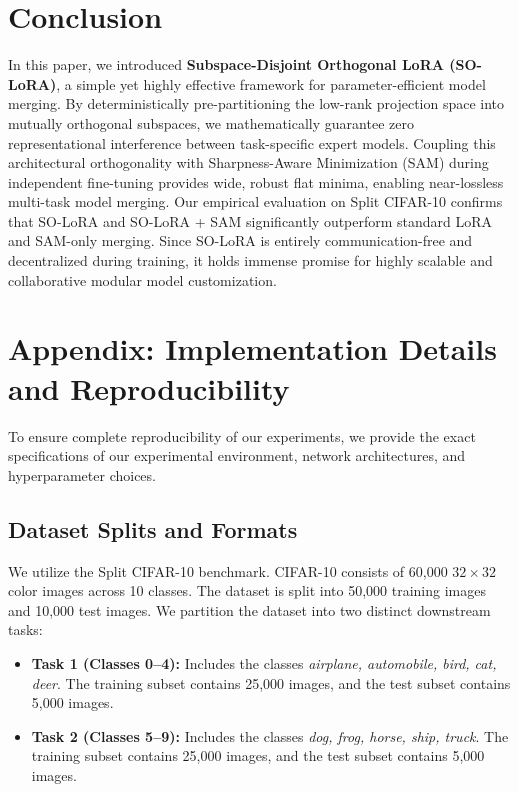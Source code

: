 \documentclass{article}
\theoremstyle{plain}
\theoremstyle{definition}
\theoremstyle{remark}
\begin{document}
\section{Conclusion}
\label{conclusion}

In this paper, we introduced \textbf{Subspace-Disjoint Orthogonal LoRA (SO-LoRA)}, a simple yet highly effective framework for parameter-efficient model merging. By deterministically pre-partitioning the low-rank projection space into mutually orthogonal subspaces, we mathematically guarantee zero representational interference between task-specific expert models. Coupling this architectural orthogonality with Sharpness-Aware Minimization (SAM) during independent fine-tuning provides wide, robust flat minima, enabling near-lossless multi-task model merging. Our empirical evaluation on Split CIFAR-10 confirms that SO-LoRA and SO-LoRA + SAM significantly outperform standard LoRA and SAM-only merging. Since SO-LoRA is entirely communication-free and decentralized during training, it holds immense promise for highly scalable and collaborative modular model customization.

\nocite{*}



\newpage
\appendix
\section{Appendix: Implementation Details and Reproducibility}
\label{appendix}

To ensure complete reproducibility of our experiments, we provide the exact specifications of our experimental environment, network architectures, and hyperparameter choices.

\subsection{Dataset Splits and Formats}
We utilize the Split CIFAR-10 benchmark. CIFAR-10 consists of 60,000 $32 \times 32$ color images across 10 classes. The dataset is split into 50,000 training images and 10,000 test images.
We partition the dataset into two distinct downstream tasks:
\begin{itemize}
  \item \textbf{Task 1 (Classes 0--4):} Includes the classes \textit{airplane, automobile, bird, cat, deer}. The training subset contains 25,000 images, and the test subset contains 5,000 images.
  \item \textbf{Task 2 (Classes 5--9):} Includes the classes \textit{dog, frog, horse, ship, truck}. The training subset contains 25,000 images, and the test subset contains 5,000 images.
\end{itemize}
\end{document}
